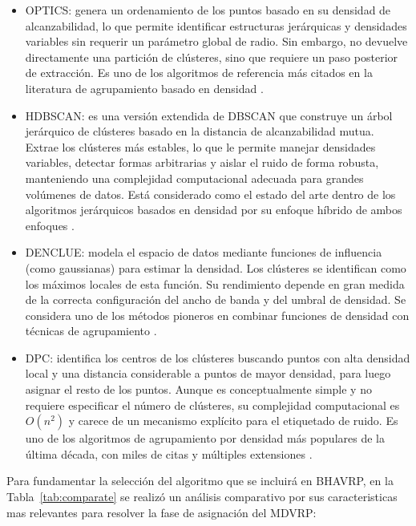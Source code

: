 \begin{itemize}
\item OPTICS: genera un ordenamiento de los puntos basado en su densidad de alcanzabilidad, lo que permite identificar estructuras jerárquicas y densidades variables sin requerir un parámetro global de radio. Sin embargo, no devuelve directamente una partición de clústeres, sino que requiere un paso posterior de extracción. Es uno de los algoritmos de referencia más citados en la literatura de agrupamiento basado en densidad \parencite{ankerst1999optics}.

\item HDBSCAN: es una versión extendida de DBSCAN que construye un árbol jerárquico de clústeres basado en la distancia de alcanzabilidad mutua. Extrae los clústeres más estables, lo que le permite manejar densidades variables, detectar formas arbitrarias y aislar el ruido de forma robusta, manteniendo una complejidad computacional adecuada para grandes volúmenes de datos. Está considerado como el estado del arte dentro de los algoritmos jerárquicos basados en densidad por su enfoque híbrido de ambos enfoques \parencite{campello2013density}.

\item DENCLUE: modela el espacio de datos mediante funciones de influencia (como gaussianas) para estimar la densidad. Los clústeres se identifican como los máximos locales de esta función. Su rendimiento depende en gran medida de la correcta configuración del ancho de banda y del umbral de densidad. Se considera uno de los métodos pioneros en combinar funciones de densidad con técnicas de agrupamiento \parencite{hinneburg1998efficient}.

\item DPC: identifica los centros de los clústeres buscando puntos con alta densidad local y una distancia considerable a puntos de mayor densidad, para luego asignar el resto de los puntos. Aunque es conceptualmente simple y no requiere especificar el número de clústeres, su complejidad computacional es \(O(n^2)\) y carece de un mecanismo explícito para el etiquetado de ruido. Es uno de los algoritmos de agrupamiento por densidad más populares de la última década, con miles de citas y múltiples extensiones \parencite{rodriguez2014clustering}.
\end{itemize}

Para fundamentar la selección del algoritmo que se incluirá en BHAVRP, en la Tabla~\ref{tab:comparate} se realizó un análisis comparativo por sus caracteristicas mas relevantes para resolver la fase de asignación del MDVRP:


